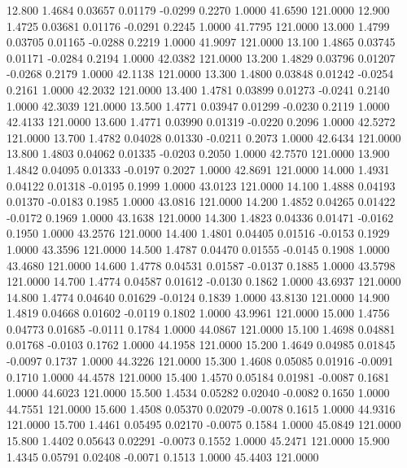   12.800   1.4684   0.03657   0.01179  -0.0299   0.2270   1.0000  41.6590 121.0000
  12.900   1.4725   0.03681   0.01176  -0.0291   0.2245   1.0000  41.7795 121.0000
  13.000   1.4799   0.03705   0.01165  -0.0288   0.2219   1.0000  41.9097 121.0000
  13.100   1.4865   0.03745   0.01171  -0.0284   0.2194   1.0000  42.0382 121.0000
  13.200   1.4829   0.03796   0.01207  -0.0268   0.2179   1.0000  42.1138 121.0000
  13.300   1.4800   0.03848   0.01242  -0.0254   0.2161   1.0000  42.2032 121.0000
  13.400   1.4781   0.03899   0.01273  -0.0241   0.2140   1.0000  42.3039 121.0000
  13.500   1.4771   0.03947   0.01299  -0.0230   0.2119   1.0000  42.4133 121.0000
  13.600   1.4771   0.03990   0.01319  -0.0220   0.2096   1.0000  42.5272 121.0000
  13.700   1.4782   0.04028   0.01330  -0.0211   0.2073   1.0000  42.6434 121.0000
  13.800   1.4803   0.04062   0.01335  -0.0203   0.2050   1.0000  42.7570 121.0000
  13.900   1.4842   0.04095   0.01333  -0.0197   0.2027   1.0000  42.8691 121.0000
  14.000   1.4931   0.04122   0.01318  -0.0195   0.1999   1.0000  43.0123 121.0000
  14.100   1.4888   0.04193   0.01370  -0.0183   0.1985   1.0000  43.0816 121.0000
  14.200   1.4852   0.04265   0.01422  -0.0172   0.1969   1.0000  43.1638 121.0000
  14.300   1.4823   0.04336   0.01471  -0.0162   0.1950   1.0000  43.2576 121.0000
  14.400   1.4801   0.04405   0.01516  -0.0153   0.1929   1.0000  43.3596 121.0000
  14.500   1.4787   0.04470   0.01555  -0.0145   0.1908   1.0000  43.4680 121.0000
  14.600   1.4778   0.04531   0.01587  -0.0137   0.1885   1.0000  43.5798 121.0000
  14.700   1.4774   0.04587   0.01612  -0.0130   0.1862   1.0000  43.6937 121.0000
  14.800   1.4774   0.04640   0.01629  -0.0124   0.1839   1.0000  43.8130 121.0000
  14.900   1.4819   0.04668   0.01602  -0.0119   0.1802   1.0000  43.9961 121.0000
  15.000   1.4756   0.04773   0.01685  -0.0111   0.1784   1.0000  44.0867 121.0000
  15.100   1.4698   0.04881   0.01768  -0.0103   0.1762   1.0000  44.1958 121.0000
  15.200   1.4649   0.04985   0.01845  -0.0097   0.1737   1.0000  44.3226 121.0000
  15.300   1.4608   0.05085   0.01916  -0.0091   0.1710   1.0000  44.4578 121.0000
  15.400   1.4570   0.05184   0.01981  -0.0087   0.1681   1.0000  44.6023 121.0000
  15.500   1.4534   0.05282   0.02040  -0.0082   0.1650   1.0000  44.7551 121.0000
  15.600   1.4508   0.05370   0.02079  -0.0078   0.1615   1.0000  44.9316 121.0000
  15.700   1.4461   0.05495   0.02170  -0.0075   0.1584   1.0000  45.0849 121.0000
  15.800   1.4402   0.05643   0.02291  -0.0073   0.1552   1.0000  45.2471 121.0000
  15.900   1.4345   0.05791   0.02408  -0.0071   0.1513   1.0000  45.4403 121.0000
